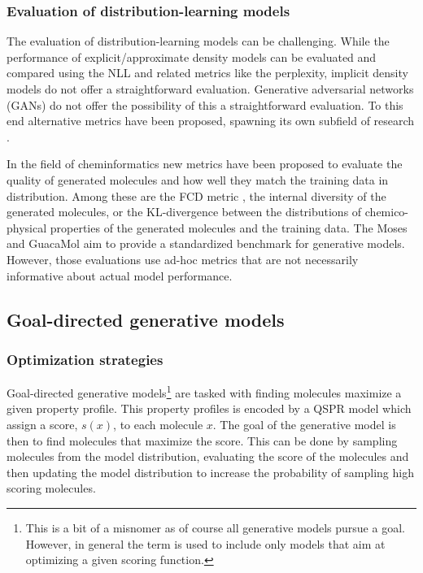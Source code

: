 \subsubsection{Evaluation of distribution-learning models}
The evaluation of distribution-learning models can be challenging. While the performance of
explicit/approximate density models can be evaluated and compared using the \ac{NLL} and related
metrics like the perplexity, implicit density models do not offer a straightforward evaluation.
Generative adversarial networks (GANs) \citep{goodfellowGenerativeAdversarialNetworks2014} do not
offer the possibility of this a straightforward evaluation. To this end alternative metrics have
been proposed, spawning its own subfield of research \citep{heuselGANsTrainedTwo2017}.

In the field of cheminformatics new metrics have been proposed to evaluate the quality of generated
molecules and how well they match the training data in distribution. Among these are the FCD metric
\citep{preuerFrechetChemNetDistance2018}, the internal diversity
\citep{benhendaChemGANChallengeDrug2017} of the generated molecules, or the KL-divergence between
the distributions of chemico-physical properties of the generated molecules and the training data.
The Moses \citet{polykovskiyMolecularSetsMOSES2020} and GuacaMol
\citet{brownGuacaMolBenchmarkingModels2019} aim to provide a standardized benchmark for generative
models. However, those evaluations use ad-hoc metrics that are not necessarily informative about
actual model performance.

\subsection{Goal-directed generative models\label{sec:eval-gen}}
\subsubsection{Optimization strategies}
Goal-directed generative models\footnote{This is a bit of a misnomer as of course all generative
      models pursue a goal. However, in general the term is used to include only models that aim at
      optimizing a given scoring function. } are tasked with finding molecules maximize a given property
profile. This property profiles is encoded by a \ac{QSPR} model which assign a score, $s(x)$, to
each molecule $x$. The goal of the generative model is then to find molecules that maximize the
score. This can be done by sampling molecules from the model distribution, evaluating the score of
the molecules and then updating the model distribution to increase the probability of sampling high
scoring molecules.


